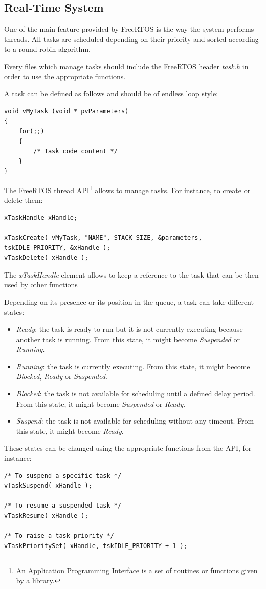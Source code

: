 \subsection{Real-Time System}

\hspace{15mm}One of the main feature provided by FreeRTOS is the way the system performs threads. All tasks are scheduled depending on their priority and sorted according to a round-robin algorithm.

Every files which manage tasks should include the FreeRTOS header \textit{task.h} in order to use the appropriate functions.

A task can be defined as follows and should be of endless loop style:\clearpage
\begin{lstlisting}
void vMyTask (void * pvParameters)
{
	for(;;)
	{
		/* Task code content */
	}
}
\end{lstlisting}

The FreeRTOS thread API\footnote{An Application Programming Interface is a set of routines or functions given by a library.} allows to manage tasks. For instance, to create or delete them:
\begin{lstlisting}
xTaskHandle xHandle;

xTaskCreate( vMyTask, "NAME", STACK_SIZE, &parameters, tskIDLE_PRIORITY, &xHandle );
vTaskDelete( xHandle );
\end{lstlisting}
The \textit{xTaskHandle} element allows to keep a reference to the task that can be then used by other functions

Depending on its presence or its position in the queue, a task can take different states:
\begin{itemize}
\item \textit{Ready}: the task is ready to run but it is not currently executing because another task is running. From this state, it might become \textit{Suspended} or \textit{Running}.
\item \textit{Running}: the task is currently executing. From this state, it might become \textit{Blocked}, \textit{Ready} or \textit{Suspended}.
\item \textit{Blocked}: the task is not available for scheduling until a defined delay period. From this state, it might become \textit{Suspended} or \textit{Ready}.
\item \textit{Suspend}: the task is not available for scheduling without any timeout. From this state, it might become \textit{Ready}.
\end{itemize}
These states can be changed using the appropriate functions from the API, for instance:
\begin{lstlisting}
/* To suspend a specific task */
vTaskSuspend( xHandle );

/* To resume a suspended task */
vTaskResume( xHandle );

/* To raise a task priority */
vTaskPrioritySet( xHandle, tskIDLE_PRIORITY + 1 );
\end{lstlisting}


